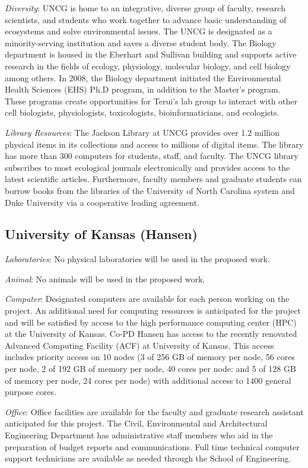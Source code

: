 \documentclass[12pt, class=article, crop=false]{standalone}
\begin{document}
\textit{Diversity}: UNCG is home to an integrative, diverse group of faculty, research scientists, and students who work together to advance basic understanding of ecosystems and solve environmental issues. The UNCG is designated as a minority-serving institution and saves a diverse student body.
The Biology department is housed in the Eberhart and Sullivan building
and supports active research in the fields of ecology, physiology, molecular biology, and cell biology among others.
In 2008, the Biology department initiated the Environmental Health Sciences (EHS) Ph.D program, in addition to the Master's program.
These programs create opportunities for Terui's lab group to interact with other cell biologists, physiologists, toxicologists, bioinformaticians, and ecologists.

\textit{Library Resources}: The Jackson Library at UNCG provides over 1.2 million physical items in its collections and access to millions of digital items. The library has more than 300 computers for students, staff, and faculty. The UNCG library subscribes to most ecological journals electronically and provides access to the latest scientific articles.
Furthermore, faculty members and graduate students can borrow books from the libraries of the University of North Carolina system and Duke University via a cooperative leading agreement.

\subsection*{University of Kansas (Hansen)}
\textit{Laboratories}: No physical laboratories will be used in the proposed work.

\textit{Animal}: No animals will be used in the proposed work.

\textit{Computer}: Designated computers are available for each person working on the project.
An additional need for computing resources is anticipated for the project and will be satisfied by access to the high performance computing center (HPC) at the University of Kansas.
Co-PD Hansen has access to the recently renovated Advanced Computing Facility (ACF) at University of Kansas.
This access includes priority access on 10 nodes (3 of 256 GB of memory per node, 56 cores per node, 2 of 192 GB of memory per node, 40 cores per node: and 5 of 128 GB of memory per node, 24 cores per node) with additional access to 1400 general purpose cores. 

\textit{Office}: Office facilities are available for the faculty and graduate research assistant anticipated for this project.
The Civil, Environmental and Architectural Engineering Department has administrative staff members who aid in the preparation of budget reports and communications.
Full time technical computer support technicians are available as needed through the School of Engineering.
\end{document}
